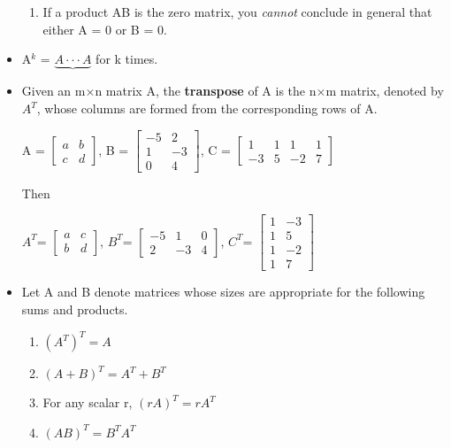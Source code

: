 \documentclass{report}
\newcommand{\mxn}{m$\times$n}
\newcommand{\nxm}{n$\times$m}
\begin{document}
\begin{itemize}
\begin{enumerate}
		\item If a product AB is the zero matrix, you \textit{cannot} conclude in general that either A = 0 or B = 0.
		\end{enumerate}
		\item A$^k$ = $\underbrace{A \cdot \cdot \cdot A}$ for k times.
		\item Given an {\mxn} matrix A, the \textbf{transpose} of A is the {\nxm} matrix, denoted by {$A^T$}, whose columns are formed from the corresponding rows of A.
		\begin{center}
			A = 
			$\begin{bmatrix}
			a & b\\
			c & d
			\end{bmatrix}$,
			B = 
			$\begin{bmatrix}
			-5 & 2\\
			1 & -3\\
			0 & 4
			\end{bmatrix}$,
			C = 
			$\begin{bmatrix}
			1 & 1 & 1 & 1\\
			-3 & 5 & -2 & 7
			\end{bmatrix}$
		\end{center}
		Then
		\begin{center}
		$A^T$=
			$\begin{bmatrix}
			a & c\\
			b & d
			\end{bmatrix}$,
		$B^T$=
			$\begin{bmatrix}
			-5 & 1 & 0\\
			2 & -3 & 4
			\end{bmatrix}$,
		$C^T$=
			$\begin{bmatrix}
			1 & -3\\
			1 & 5\\
			1 & -2\\
			1 & 7
			\end{bmatrix}$
		\end{center}
		\item Let A and B denote matrices whose sizes are appropriate for the following sums and products.
		\begin{enumerate}\addtolength{\leftskip}{2em}
		\item $(A^T)^T=A$
		\item $(A+B)^T=A^T+B^T$ 
		\item For any scalar r, $(rA)^T=rA^T$
		\item $(AB)^T=B^TA^T$
		\end{enumerate}
	\end{itemize}
\end{document}
